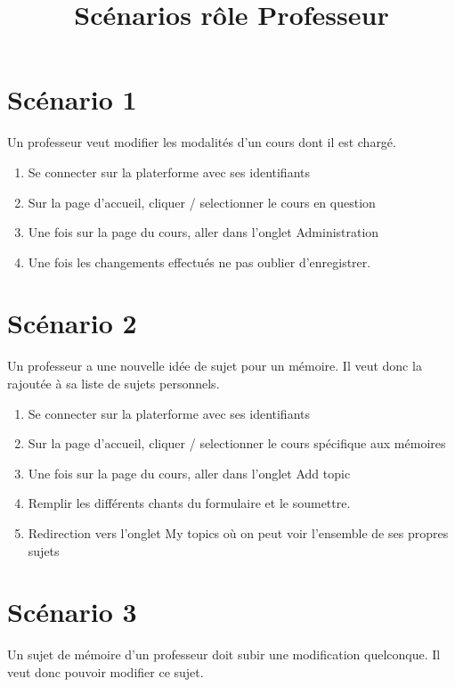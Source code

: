 \documentclass[a4paper, 11pt]{article}
\title{Scénarios rôle \bf Professeur}
\author{}
\begin{document}
\maketitle

\section*{Scénario 1}
Un professeur veut modifier les modalités d'un cours dont il est chargé.

\begin{tcolorbox}
    \begin{enumerate}
        \item Se connecter sur la platerforme avec ses identifiants
        \item Sur la page d'accueil, cliquer / selectionner le cours en question
        \item Une fois sur la page du cours, aller dans l'onglet \og Administration\fg{}
        \item Une fois les changements effectués ne pas oublier d'enregistrer.
    \end{enumerate}
\end{tcolorbox}

\section*{Scénario 2}
Un professeur a une nouvelle idée de sujet pour un mémoire. Il veut donc la rajoutée à sa liste de sujets personnels.

\begin{tcolorbox}
    \begin{enumerate}
        \item Se connecter sur la platerforme avec ses identifiants
        \item Sur la page d'accueil, cliquer / selectionner le cours spécifique aux mémoires
        \item Une fois sur la page du cours, aller dans l'onglet \og Add topic\fg{}
        \item Remplir les différents chants du formulaire et le soumettre.
        \item Redirection vers l'onglet \og My topics\fg{} où on peut voir l'ensemble de ses propres sujets
    \end{enumerate}
\end{tcolorbox}

\section*{Scénario 3}
Un sujet de mémoire d'un professeur doit subir une modification quelconque. Il veut donc pouvoir modifier ce sujet.
\end{document}
